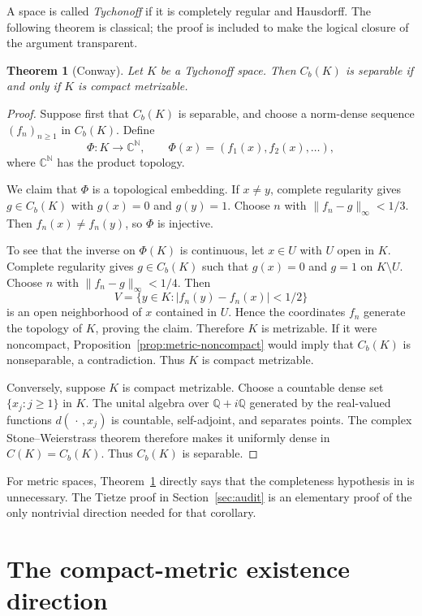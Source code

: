\documentclass[11pt]{article}
\newtheorem{theorem}{Theorem}[section]
\theoremstyle{remark}
\newcommand{\Cb}{C_b}
\newcommand{\N}{\mathbb N}
\newcommand{\C}{\mathbb C}
\newcommand{\Q}{\mathbb Q}
\begin{document}
A space is called \emph{Tychonoff} if it is completely regular and Hausdorff.
The following theorem is classical; the proof is included to make the logical
closure of the argument transparent.

\begin{theorem}[Conway]\label{thm:conway}
Let $K$ be a Tychonoff space.  Then $\Cb(K)$ is separable if and only if $K$ is
compact metrizable.
\end{theorem}

\begin{proof}
Suppose first that $\Cb(K)$ is separable, and choose a norm-dense sequence
$(f_n)_{n\geq 1}$ in $\Cb(K)$.  Define
\[
  \Phi:K\longrightarrow \C^{\N},\qquad
  \Phi(x)=(f_1(x),f_2(x),\ldots),
\]
where $\C^{\N}$ has the product topology.

We claim that $\Phi$ is a topological embedding.  If $x\neq y$, complete
regularity gives $g\in\Cb(K)$ with $g(x)=0$ and $g(y)=1$.  Choose $n$ with
$\lVert f_n-g\rVert_\infty<1/3$.  Then $f_n(x)\neq f_n(y)$, so $\Phi$ is
injective.

To see that the inverse on $\Phi(K)$ is continuous, let $x\in U$ with $U$ open
in $K$.  Complete regularity gives $g\in\Cb(K)$ such that
$g(x)=0$ and $g=1$ on $K\setminus U$.  Choose $n$ with
$\lVert f_n-g\rVert_\infty<1/4$.  Then
\[
  V=\{y\in K:|f_n(y)-f_n(x)|<1/2\}
\]
is an open neighborhood of $x$ contained in $U$.  Hence the coordinates
$f_n$ generate the topology of $K$, proving the claim.  Therefore $K$ is
metrizable.  If it were noncompact, Proposition~\ref{prop:metric-noncompact}
would imply that $\Cb(K)$ is nonseparable, a contradiction.  Thus $K$ is
compact metrizable.

Conversely, suppose $K$ is compact metrizable.  Choose a countable dense set
$\{x_j:j\geq1\}$ in $K$.  The unital algebra over $\Q+i\Q$ generated by the
real-valued functions $d(\,\cdot\,,x_j)$ is countable, self-adjoint, and
separates points.  The complex Stone--Weierstrass theorem therefore makes it
uniformly dense in $C(K)=\Cb(K)$.  Thus $\Cb(K)$ is separable.
\end{proof}

For metric spaces, Theorem~\ref{thm:conway} directly says that the
completeness hypothesis in \cite[Theorem 16.1]{CFJ} is unnecessary.  The
Tietze proof in Section~\ref{sec:audit} is an elementary proof of the only
nontrivial direction needed for that corollary.

\section{The compact-metric existence direction}\label{sec:existence}
\end{document}
